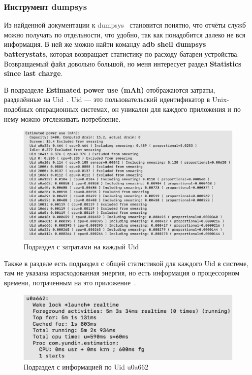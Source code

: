 \documentclass[a4paper,14pt]{extarticle} %
\begin{document}
	\subsubsection{Инструмент dumpsys}
	
	Из найденной документации к dumpsys~\parencite{Dumpsys} становится понятно, что отчёты служб можно получать по отдельности, что удобно, так как понадобится далеко не вся информация. В ней же можно найти команду \textbf{adb shell dumpsys batterystats}, которая возвращает статистику по расходу батареи устройства. Возвращаемый файл довольно большой, но меня интересует раздел \textbf{Statistics since last charge}. 
	
	В подразделе \textbf{Estimated power use (mAh)} отображаются затраты, разделённые на Uid~\ris{\ref{fig:estimated_use}}. Uid --- это пользовательский идентификатор в Unix-подобных операционных системах, он уникален для каждого приложения и по нему можно отслеживать потребление. 
	
	\begin{figure}[H]
		\includegraphics[width=\textwidth]{estimated_use}
		\caption{Подраздел с затратами на каждый Uid}
		\label{fig:estimated_use}
	\end{figure}
	
	Также в разделе есть подраздел с общей статистикой для каждого Uid в системе, там не указана израсходованная энергия, но есть информация о процессорном времени, потраченным на это приложение~\ris{\ref{fig:uid_subsection}}.

	\begin{figure}[H]
		\includegraphics[width=\textwidth]{uid_subsection}
		\caption{Подраздел с информацией по Uid u0a662}
		\label{fig:uid_subsection}
	\end{figure}
\end{document}
